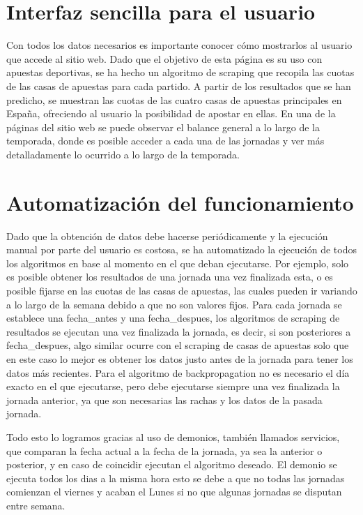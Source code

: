 \section{Interfaz sencilla para el usuario}

Con todos los datos necesarios es importante conocer cómo mostrarlos al usuario que accede al sitio web. Dado que el objetivo de esta página es su uso con apuestas deportivas, se ha hecho un algoritmo de scraping que recopila las cuotas de las casas de apuestas para cada partido.
A partir de los resultados que se han predicho, se muestran las cuotas de las cuatro casas de apuestas principales en España, ofreciendo al usuario la posibilidad de apostar en ellas.
En una de la páginas del sitio web se puede observar el balance general a lo largo de la temporada, donde es posible acceder a cada una de las jornadas y ver más detalladamente lo ocurrido a lo largo de la temporada.

\section{Automatización del funcionamiento}

Dado que la obtención de datos debe hacerse periódicamente y la ejecución manual por parte del usuario es costosa, se ha automatizado la ejecución de todos los algoritmos en base al momento en el que deban ejecutarse. Por ejemplo, solo es posible obtener los resultados de una jornada una vez finalizada esta, o es posible fijarse en las cuotas de las casas de apuestas, las cuales pueden ir variando a lo largo de la semana debido a que no son valores fijos.
Para cada jornada se establece una fecha\_antes y una fecha\_despues, los algoritmos de scraping de resultados se ejecutan una vez finalizada la jornada, es decir, si son posteriores a fecha\_despues, algo similar ocurre con el scraping de casas de apuestas solo que en este caso lo mejor es obtener los datos justo antes de la jornada para tener los datos más recientes. Para el algoritmo de backpropagation no es necesario el día exacto en el que ejecutarse, pero debe ejecutarse siempre una vez finalizada la jornada anterior, ya que son necesarias las rachas y los datos de la pasada jornada.

Todo esto lo logramos gracias al uso de demonios, también llamados servicios, que comparan la fecha actual a la fecha de la jornada, ya sea la anterior o posterior, y en caso de coincidir ejecutan el algoritmo deseado. El demonio se ejecuta todos los dias a la misma hora esto se debe a que no todas las jornadas comienzan el viernes y acaban el Lunes si no que algunas jornadas se disputan entre semana.
